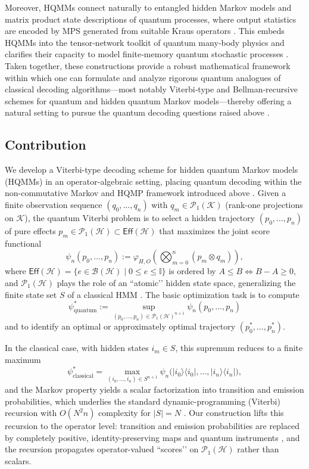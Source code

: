 \documentclass[12pt, reco]{article}
\begin{document}
Moreover, HQMMs connect naturally to entangled hidden Markov models and matrix product state descriptions of quantum processes, where output statistics are encoded by MPS generated from suitable Kraus operators \cite{SS23,Sou25,FLW24}. This embeds HQMMs into the tensor‑network toolkit of quantum many‑body physics and clarifies their capacity to model finite‑memory quantum stochastic processes \cite{Monras11,Sou25,FLW24}. Taken together, these constructions provide a robust mathematical framework within which one can formulate and analyze rigorous quantum analogues of classical decoding algorithms—most notably Viterbi‑type and Bellman‑recursive schemes for quantum and hidden quantum Markov models—thereby offering a natural setting to pursue the quantum decoding questions raised above \cite{ASS20,AGLS24Q,Monras11,Sou25}.



\subsection{Contribution}

We develop a Viterbi-type decoding scheme for hidden quantum Markov models (HQMMs) in an operator-algebraic setting, placing quantum decoding within the non-commutative Markov and HQMP framework introduced above \cite{ASS20,AGLS24Q,Monras11}. Given a finite observation sequence \((q_0,\dots,q_n)\) with \(q_m\in\mathcal{P}_1(\mathcal{K})\) (rank-one projections on \(\mathcal{K}\)), the quantum Viterbi problem is to select a hidden trajectory \((p_0,\dots,p_n)\) of pure effects \(p_m\in\mathcal{P}_1(\mathcal{H})\subset\mathsf{Eff}(\mathcal{H})\) that maximizes the joint score functional
\[
\psi_n(p_0,\dots,p_n)
:=
\varphi_{H,O}\!\left(\bigotimes_{m=0}^n (p_m\otimes q_m)\right),
\]
where \(\mathsf{Eff}(\mathcal{H})=\{e\in\mathcal{B}(\mathcal{H})\mid 0\le e\le \mathbb{I}\}\) is ordered by \(A\le B \Leftrightarrow B-A\ge 0\), and \(\mathcal{P}_1(\mathcal{H})\) plays the role of an “atomic’’ hidden state space, generalizing the finite state set \(S\) of a classical HMM \cite{ASS20,AGLS24Q}. The basic optimization task is to compute
\[
\psi_{\mathrm{quantum}}^*
:=
\sup_{(p_0,\dots,p_n)\in\mathcal{P}_1(\mathcal{H})^{n+1}}
\psi_n(p_0,\dots,p_n)
\]
and to identify an optimal or approximately optimal trajectory \((p_0^*,\dots,p_n^*)\).

In the classical case, with hidden states \(i_m\in S\), this supremum reduces to a finite maximum
\[
\psi_{\mathrm{classical}}^*
=
\max_{(i_0,\dots,i_n)\in S^{n+1}}
\psi_n\bigl(|i_0\rangle\!\langle i_0|,\dots,|i_n\rangle\!\langle i_n|\bigr),
\]
and the Markov property yields a scalar factorization into transition and emission probabilities, which underlies the standard dynamic-programming (Viterbi) recursion with \(O(N^2 n)\) complexity for \(|S|=N\) \cite{Rab2002,V03,FV05}. Our construction lifts this recursion to the operator level: transition and emission probabilities are replaced by completely positive, identity-preserving maps and quantum instruments \cite{accardi1974,Ib08,AGLS24Q}, and the recursion propagates operator-valued “scores’’ on \(\mathcal{P}_1(\mathcal{H})\) rather than scalars.
\end{document}
